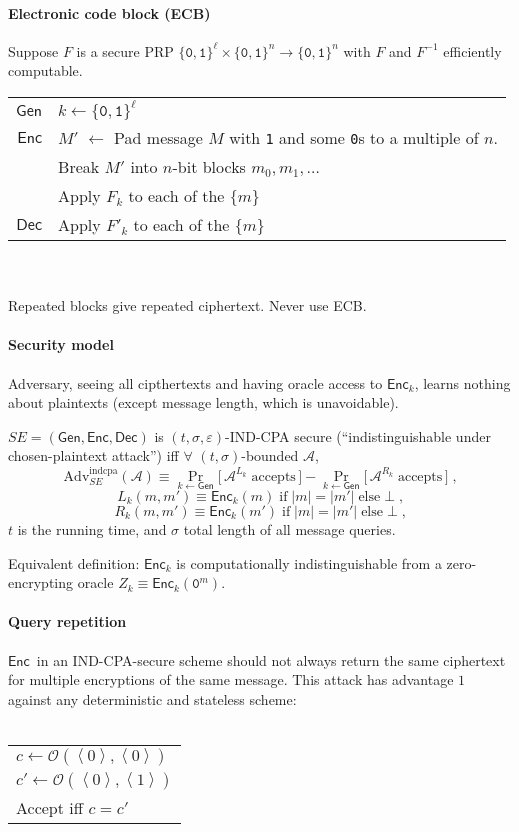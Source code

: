 \documentclass[11pt]{article}
\newcommand{\eqdef}{\ensuremath{\equiv}}
\newcommand{\Gen}{\ensuremath{\mathsf{Gen}}}
\newcommand{\Enc}{\ensuremath{\mathsf{Enc}}}
\newcommand{\Dec}{\ensuremath{\mathsf{Dec}}}
\newcommand{\eps}{\ensuremath{\varepsilon}}
\newcommand{\bit}{\ensuremath{\{\texttt{0},\texttt{1}\}}}
\newcommand{\ang}[1]{\ensuremath{\left\langle#1\right\rangle}}
\theoremstyle{remark}
\begin{document}
\paragraph{Electronic code block (ECB)}
Suppose $F$ is a secure PRP
$\bit^\ell\times\bit^n\rightarrow\bit^n$
with $F$ and $F^{-1}$ efficiently computable.
~\\[5pt]
\begin{tabular}{r|l}
\Gen & $k \leftarrow \bit^\ell$ \\[5pt]
\Enc & $M'$ $\leftarrow$ Pad message $M$
       with \texttt{1} and some \texttt{0}s
       to a multiple of $n$. \\
     & Break $M'$ into $n$-bit blocks $m_0, m_1, \ldots$ \\
     & Apply $F_k$ to each of the $\{m\}$ \\[5pt]
\Dec & Apply $F'_k$ to each of the $\{m\}$
\end{tabular}\\\\
Repeated blocks give repeated ciphertext.
Never use ECB.

\paragraph{Security model}
Adversary, seeing all cipthertexts and
having oracle access to $\Enc_k$,
learns nothing about plaintexts
(except message length, which is unavoidable).

$SE = (\Gen, \Enc, \Dec)$ is
$(t, \sigma, \eps)$-IND-CPA secure
(``indistinguishable under chosen-plaintext attack'')
iff $\forall$ $(t, \sigma)$-bounded $\mathcal{A}$, \[
\text{Adv}_{SE}^\text{indcpa}(\mathcal{A}) \eqdef
\Pr_{k \leftarrow \Gen} \big[\, \mathcal{A}^{L_k} \; \text{accepts} \,\big]
- \Pr_{k \leftarrow \Gen} \big[\, \mathcal{A}^{R_k} \; \text{accepts} \,\big]
\;\text{,}
\]
\[ L_k(m, m') \eqdef \Enc_k(m)
\;\text{if}\; |m| = |m'|\;\text{else}\; \bot \;\text{,} \]
\[ R_k(m, m') \eqdef \Enc_k(m')
\;\text{if}\; |m| = |m'|\;\text{else}\; \bot \;\text{,} \]
$t$ is the running time, and
$\sigma$ total length of all message queries.

Equivalent definition:
$\Enc_k$ is computationally indistinguishable from
a zero-encrypting oracle $Z_k \eqdef \Enc_k(\texttt{0}^m)$.

\paragraph{Query repetition}
\Enc\ in an IND-CPA-secure scheme should not always return the same ciphertext
for multiple encryptions of the same message.
This attack has advantage $1$ against any deterministic and stateless scheme:
\\~\\
\begin{tabular}{|l}
$c \leftarrow \mathcal{O}(\ang{0}, \ang{0})$\\
$c' \leftarrow \mathcal{O}(\ang{0}, \ang{1})$\\
Accept iff $c = c'$
\end{tabular}
\end{document}
